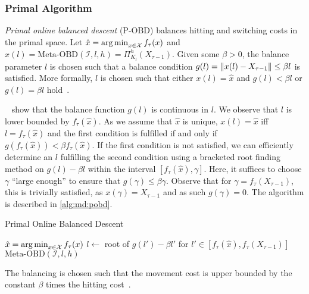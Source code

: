 \subsubsection{Primal Algorithm}

\emph{Primal online balanced descent} (P-OBD) balances hitting and switching costs in the primal space. Let $\hat{x} = \operatorname*{arg\,min}_{x \in \mathcal{X}} f_{\tau}(x)$ and $x(l) = \text{Meta-OBD}(\mathcal{I}, l, h) = \Pi_{K_l}^h(X_{\tau-1})$. Given some $\beta > 0$, the balance parameter $l$ is chosen such that a balance condition $g(l) = \lVert x(l) - X_{\tau-1}\rVert \leq \beta l$ is satisfied. More formally, $l$ is chosen such that either $x(l) = \hat{x}$ and $g(l) < \beta l$ or $g(l) = \beta l$ hold~\cite{Goel2018}.

\citeauthor*{Goel2018}~\cite{Goel2018} show that the balance function $g(l)$ is continuous in $l$. We observe that $l$ is lower bounded by $f_{\tau}(\hat{x})$. As we assume that $\hat{x}$ is unique, $x(l) = \hat{x}$ iff $l = f_{\tau}(\hat{x})$ and the first condition is fulfilled if and only if $g(f_{\tau}(\hat{x})) < \beta f_{\tau}(\hat{x})$. If the first condition is not satisfied, we can efficiently determine an $l$ fulfilling the second condition using a bracketed root finding method on $g(l) - \beta l$ within the interval $[f_{\tau}(\hat{x}), \gamma]$. Here, it suffices to choose $\gamma$ ``large enough'' to ensure that $g(\gamma) \leq \beta \gamma$. Observe that for $\gamma = f_{\tau}(X_{\tau-1})$, this is trivially satisfied, as $x(\gamma) = X_{\tau-1}$ and as such $g(\gamma) = 0$. The algorithm is described in \cref{alg:md:pobd}.

\begin{algorithm}
    \caption{Primal Online Balanced Descent~\cite{Goel2018}}\label{alg:md:pobd}
    $\hat{x} = \operatorname*{arg\,min}_{x \in \mathcal{X}} f_{\tau}(x)$\;
    $l \gets $ root of $g(l') - \beta l'$ for $l' \in [f_{\tau}(\hat{x}), f_{\tau}(X_{\tau-1})]$\;
    \Return $\text{Meta-OBD}(\mathcal{I}, l, h)$\;
\end{algorithm}

The balancing is chosen such that the movement cost is upper bounded by the constant $\beta$ times the hitting cost~\cite{Goel2018}.

